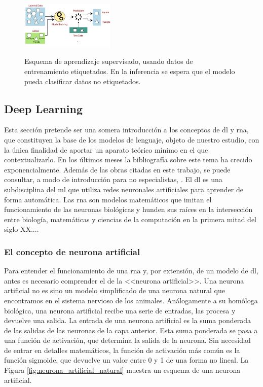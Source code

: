\begin{figure}[H]
    \caption[Esquema de aprendizaje supervisado]{Esquema de aprendizaje supervisado, usando datos de entrenamiento etiquetados. En la inferencia se espera que el modelo pueda clasificar datos no etiquetados.}
    \centering
    \includegraphics[width=0.4\textwidth]{./figuras/labeled_data_training.png}
    \label{fig:labeled_data_training}
\end{figure}


\subsection{Deep Learning}

Esta sección pretende ser una somera introducción a los conceptos de \gls{dl} y \gls{rna}, que constituyen la base de los modelos de lenguaje, objeto de nuestro estudio, con la única finalidad de aportar un aparato teórico mínimo en el que contextualizarlo. En los últimos meses la bibliografía sobre este tema ha crecido exponencialmente. Además de las obras citadas en este trabajo, se puede consultar, a modo de introducción para no especialistas, \cite{BeginnerGuideNeural}. El \gls{dl} es una subdisciplina del \gls{ml} que utiliza redes neuronales artificiales para aprender de forma automática. Las \gls{rna} son modelos matemáticos que imitan el funcionamiento de las neuronas biológicas y hunden sus raíces en la intersección entre biología, matemáticas y ciencias de la computación en la primera mitad del siglo XX....

\subsubsection{El concepto de neurona artificial}

Para entender el funcionamiento de una \gls{rna} y, por extensión, de un modelo de \gls{dl}, antes es necesario comprender el de la <<neurona artificial>>. Una neurona artificial no es sino un modelo simplificado de una neurona natural que encontramos en el sistema nervioso de los animales. Análogamente a su homóloga biológica, una neurona artificial recibe una serie de entradas, las procesa y devuelve una salida. La entrada de una neurona artificial es la suma ponderada de las salidas de las neuronas de la capa anterior. Esta suma ponderada se pasa a una función de activación, que determina la salida de la neurona. Sin necesidad de entrar en detalles matemáticos, la función de activación más común es la función sigmoide, que devuelve un valor entre 0 y 1 de una forma no lineal. La Figura \ref{fig:neurona_artificial_natural} muestra un esquema de una neurona artificial. 

